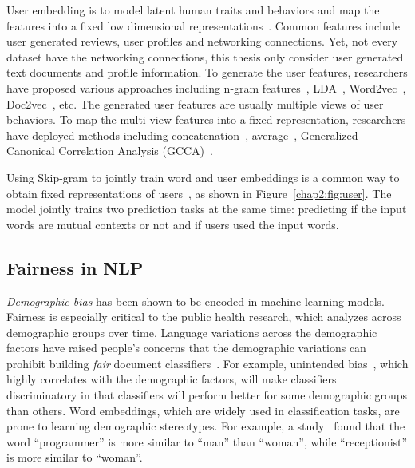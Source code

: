 User embedding is to model latent human traits and behaviors and map the features into a fixed low dimensional representations~\cite{pan2019social}. 
Common features include user generated reviews, user profiles and networking connections. 
Yet, not every dataset have the networking connections, this thesis only consider user generated text documents and profile information.
To generate the user features, researchers have proposed various approaches including n-gram features~\cite{benton2016learning}, LDA~\cite{zhang2015using, ding2017multi}, Word2vec~\cite{amir2016modelling, benton2016learning, amir2017quantifying, wu2018starspace}, Doc2vec~\cite{ding2017multi, ding2018predicting}, etc.
The generated user features are usually multiple views of user behaviors. 
To map the multi-view features into a fixed representation, researchers have deployed methods including concatenation~\cite{pennacchiotti2011a}, average~\cite{ding2017multi}, Generalized Canonical Correlation Analysis (GCCA)~\cite{benton2016learning}.

Using Skip-gram to jointly train word and user embeddings is a common way to obtain fixed representations of users~\cite{amir2017quantifying, wu2018starspace}, as shown in Figure~\ref{chap2:fig:user}.
The model jointly trains two prediction tasks at the same time: predicting if the input words are mutual contexts or not and if users used the input words.


\subsection{Fairness in NLP}

\textit{Demographic bias} has been shown to be encoded in machine learning models. 
Fairness is especially critical to the public health research, which analyzes across demographic groups over time. 
Language variations across the demographic factors have raised people's concerns that the demographic variations can prohibit building \textit{fair} document classifiers~\cite{sun2019mitigating, bender2018data}. 
For example, unintended bias~\cite{dixon2018measuring}, which highly correlates with the demographic factors, will make classifiers discriminatory in that classifiers will perform better for some demographic groups than others. 
Word embeddings, which are widely used in classification tasks, are prone to learning demographic stereotypes.
For example, a study~\cite{bolukbasi2016man} found that the word ``programmer'' is more similar to ``man'' than ``woman'', while ``receptionist'' is more similar to ``woman''.

